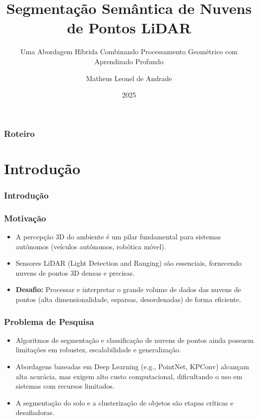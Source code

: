 \documentclass[aspectratio=169,t,xcolor=table]{beamer}
\begin{document}
\title[Inf UFG]{Segmentação Semântica de Nuvens de Pontos LiDAR}
\subtitle{Uma Abordagem Híbrida Combinando Processamento Geométrico
com Aprendizado Profundo}

\author{Matheus Leonel de Andrade}

\date{2025}
\frame[noframenumbering]{\titlepage}



\begin{frame}
    \frametitle{Roteiro}
    \tableofcontents
\end{frame}


\section{Introdução}

\begin{frame}
    \frametitle{Introdução}
\end{frame}


\begin{frame}
    \frametitle{Motivação}
    \begin{itemize}
        \item<+-> A percepção 3D do ambiente é um pilar fundamental para sistemas autônomos (veículos autônomos, robótica móvel).
        \item<+-> Sensores LiDAR (Light Detection and Ranging) são essenciais, fornecendo nuvens de pontos 3D densas e precisas.
        \item<+-> \textbf{Desafio:} Processar e interpretar o grande volume de dados das nuvens de pontos (alta dimensionalidade, esparsas, desordenadas) de forma eficiente.
    \end{itemize}
\end{frame}

\begin{frame}
    \frametitle{Problema de Pesquisa}
    \begin{itemize}
        \item<+-> Algoritmos de segmentação e classificação de nuvens de pontos ainda possuem limitações em robustez, escalabilidade e generalização.
        \item<+-> Abordagens baseadas em Deep Learning (e.g., PointNet, KPConv) alcançam alta acurácia, mas exigem alto custo computacional, dificultando o uso em sistemas com recursos limitados.
        \item<+-> A segmentação do solo e a clusterização de objetos são etapas críticas e desafiadoras.
    \end{itemize}
\end{frame}
\end{document}
